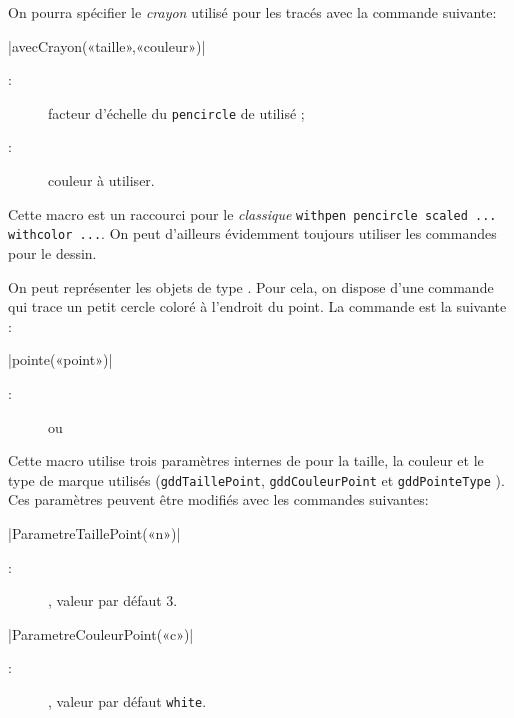 \documentclass[a4paper,french]{article}
\begin{document}
On pourra spécifier le \emph{crayon} utilisé pour les tracés avec la commande
suivante:

\begin{colourband}
  \macro|avecCrayon(«taille»,«couleur»)|
  \begin{description}
    \item[:] facteur d'échelle  du 
    \lstinline+pencircle+ de \MP{} utilisé ;
    \item[:] couleur  à utiliser. 
  \end{description}
\end{colourband}
  
Cette macro est un raccourci pour le \emph{classique} \texttt{withpen
pencircle scaled ... withcolor ...}. On peut d'ailleurs évidemment toujours
utiliser les commandes \MP{} pour le dessin. 




On peut représenter les objets de type . Pour cela, on dispose
d'une commande qui trace un petit cercle coloré à l'endroit du point. La
commande est la suivante :

\begin{colourband}
\macro|pointe(«point»)|
\begin{description}
  \item[:]  ou 
\end{description}
\end{colourband}

Cette macro utilise trois paramètres internes de \mpgeomdd pour la taille, la
couleur et le type de marque utilisés
(\lstinline+gddTaillePoint+, \lstinline+gddCouleurPoint+
 et \lstinline+gddPointeType+  
). Ces paramètres peuvent être modifiés avec les commandes suivantes:
\begin{colourband}
\macro|ParametreTaillePoint(«n»)|
\begin{description}
  \item[:] , valeur par défaut 3.
\end{description}
\end{colourband}

\begin{colourband}
\macro|ParametreCouleurPoint(«c»)| 
\begin{description}
  \item[:] , valeur par défaut \lstinline+white+.
\end{description}
\end{colourband}
\end{document}
